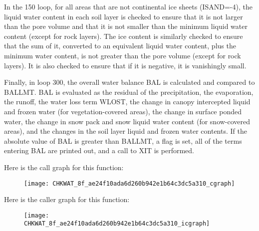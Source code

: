 In the 150 loop, for all areas that are not continental ice sheets (I\+S\+A\+N\+D=-\/4), the liquid water content in each soil layer is checked to ensure that it is not larger than the pore volume and that it is not smaller than the minimum liquid water content (except for rock layers). The ice content is similarly checked to ensure that the sum of it, converted to an equivalent liquid water content, plus the minimum water content, is not greater than the pore volume (except for rock layers). It is also checked to ensure that if it is negative, it is vanishingly small.

Finally, in loop 300, the overall water balance B\+A\+L is calculated and compared to B\+A\+L\+L\+M\+T. B\+A\+L is evaluated as the residual of the precipitation, the evaporation, the runoff, the water loss term W\+L\+O\+S\+T, the change in canopy intercepted liquid and frozen water (for vegetation-\/covered areas), the change in surface ponded water, the change in snow pack and snow liquid water content (for snow-\/covered areas), and the changes in the soil layer liquid and frozen water contents. If the absolute value of B\+A\+L is greater than B\+A\+L\+L\+M\+T, a flag is set, all of the terms entering B\+A\+L are printed out, and a call to X\+I\+T is performed.

Here is the call graph for this function\+:\nopagebreak
\begin{figure}[H]
\begin{center}
\leavevmode
\texttt{[image: CHKWAT\_8f\_ae24f10ada6d260b942e1b64c3dc5a310\_cgraph]}
\end{center}
\end{figure}




Here is the caller graph for this function\+:\nopagebreak
\begin{figure}[H]
\begin{center}
\leavevmode
\texttt{[image: CHKWAT\_8f\_ae24f10ada6d260b942e1b64c3dc5a310\_icgraph]}
\end{center}
\end{figure}


